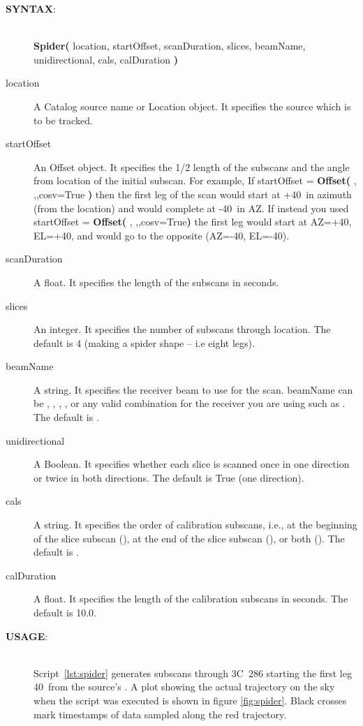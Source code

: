 \begin{description}
\item[{\bf SYNTAX}:]\ \\
{\bfseries{\textcolor{pythonKeywords}{Spider}}(}
location, startOffset, scanDuration, slices, beamName, unidirectional, cals, calDuration
{\bf)}
\item[location] A Catalog source name or Location object. It specifies the 
source which is to be tracked.
\item[startOffset] An Offset object. It specifies the 1/2 length of the 
subscans and the angle from location of the initial subscan. For example, If 
startOffset = {\bfseries{\textcolor{pythonKeywords}{Offset}}(}
, ,,cosv=True
{\bf)}
then the first leg of the scan would start at +40\arcminute\ in azimuth 
(from the location) and would complete at -40\arcminute\ in AZ.
If instead you used
startOffset = {\bfseries{\textcolor{pythonKeywords}{Offset}}(}
, ,,cosv=True{\bf)}
the first leg would start at AZ=+40\arcminute, EL=+40\arcminute, and would 
go to the opposite (AZ=-40\arcminute, EL=-40\arcminute).
\item[scanDuration] A float. It specifies the length of the subscans in 
seconds.
\item[slices] An integer. It specifies the number of subscans through 
location. The default is 4 (making a spider shape -- i.e eight legs).
\item[beamName] A string. It specifies the receiver beam to use for the 
scan. beamName can be , , , ,  or any valid
combination for the receiver you are using such as . The default
is .
\item[unidirectional] A Boolean. It specifies whether each slice is scanned 
once in one direction or twice in both directions. The default is True (one 
direction).
\item[cals] A string. It specifies the order of calibration subscans, i.e., 
at the beginning of the slice subscan (), at the end of the slice 
subscan (), or both (). The default is .
\item[calDuration] A float. It specifies the length of the calibration 
subscans in seconds. The default is 10.0.
\item[{\bf USAGE}:]\ \\
Script~\ref{lst:spider} generates subscans through 3C~286 starting the first
leg 40\arcminute\ from the source's .  A plot showing the actual
trajectory on the sky when the script was executed is shown in figure
\ref{fig:spider}.  Black crosses mark timestamps of data sampled
along the red trajectory.
\end{description}

